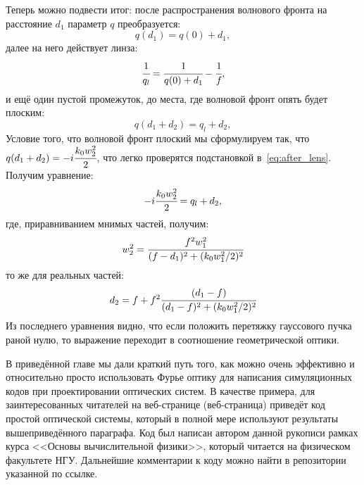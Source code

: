 Теперь можно подвести итог: после распространения волнового фронта на расстояние $d_1$ параметр $q$ преобразуется:
\begin{equation}
	q(d_1) = q(0) + d_1, 
\end{equation}
далее на него действует линза: 
\begin{equation}
	\cfrac{1}{q_l} = \cfrac{1}{q(0) + d_1} - \cfrac{1}{f},
\end{equation}
и ещё один пустой промежуток, до места, где волновой фронт опять будет плоским: 
\begin{equation}
	q(d_1 + d_2) = q_l + d_2, 
\end{equation}
Условие того, что волновой фронт плоский мы сформулируем так, что $q(d_1 + d_2) = -i\cfrac{k_0w^2_2}{2}$, что легко проверятся подстановкой в~\ref{eq:after_lens}. Получим уравнение: 
\begin{equation}
	-i\cfrac{k_0w^2_2}{2} = q_l + d_2, 
\end{equation}
где, приравниванием мнимых частей, получим: 
\begin{equation}
	w^2_2 = \cfrac{f^2w^2_1}{(f - d_1)^2 + (k_0w^2_1/2)^2}
\end{equation}
то же для реальных частей: 
\begin{equation}
	d_2 = f + f^2\cfrac{(d_1 - f)}{(d_1 - f)^2 + (k_0w^2_1/2)^2}
\end{equation}
Из последнего уравнения видно, что если положить перетяжку гауссового пучка раной нулю, то выражение переходит в соотношение геометрической оптики.

В приведённой главе мы дали краткий путь того, как можно очень эффективно и относительно просто использовать Фурье оптику для написания симуляционных кодов при проектировании оптических систем. В качестве примера, для заинтересованных читателей на веб-странице (веб-страница) приведёт код простой оптической системы, который в полной мере используют результаты вышеприведённого параграфа. Код был написан автором данной рукописи рамках курса <<Основы вычислительной физики>>, который читается на физическом факультете НГУ. Дальнейшие комментарии к коду можно найти в репозитории указанной по ссылке.
